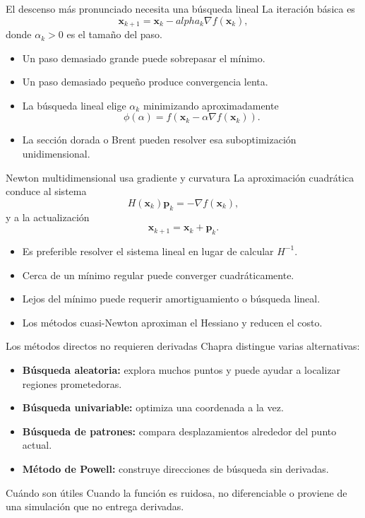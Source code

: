 \documentclass[../../main.tex]{subfiles}
\begin{document}
\begin{frame}{El descenso más pronunciado necesita una búsqueda lineal}
La iteración básica es
\[
\mathbf{x}_{k+1}
=
\mathbf{x}_k-alpha_k\nabla f(\mathbf{x}_k),
\]
donde $\alpha_k>0$ es el tamaño del paso.

\begin{itemize}
  \item Un paso demasiado grande puede sobrepasar el mínimo.
  \item Un paso demasiado pequeño produce convergencia lenta.
  \item La búsqueda lineal elige $\alpha_k$ minimizando aproximadamente
  \[
  \phi(\alpha)=f(\mathbf{x}_k-\alpha\nabla f(\mathbf{x}_k)).
  \]
  \item La sección dorada o Brent pueden resolver esa suboptimización unidimensional.
\end{itemize}
\end{frame}

\begin{frame}{Newton multidimensional usa gradiente y curvatura}
La aproximación cuadrática conduce al sistema
\[
H(\mathbf{x}_k)\mathbf{p}_k=-\nabla f(\mathbf{x}_k),
\]
y a la actualización
\[
\mathbf{x}_{k+1}=\mathbf{x}_k+\mathbf{p}_k.
\]

\begin{itemize}
  \item Es preferible resolver el sistema lineal en lugar de calcular $H^{-1}$.
  \item Cerca de un mínimo regular puede converger cuadráticamente.
  \item Lejos del mínimo puede requerir amortiguamiento o búsqueda lineal.
  \item Los métodos cuasi-Newton aproximan el Hessiano y reducen el costo.
\end{itemize}
\end{frame}

\begin{frame}{Los métodos directos no requieren derivadas}
Chapra distingue varias alternativas:
\begin{itemize}
  \item \textbf{Búsqueda aleatoria:} explora muchos puntos y puede ayudar a localizar regiones prometedoras.
  \item \textbf{Búsqueda univariable:} optimiza una coordenada a la vez.
  \item \textbf{Búsqueda de patrones:} compara desplazamientos alrededor del punto actual.
  \item \textbf{Método de Powell:} construye direcciones de búsqueda sin derivadas.
\end{itemize}

\begin{block}{Cuándo son útiles}
Cuando la función es ruidosa, no diferenciable o proviene de una simulación que no entrega derivadas.
\end{block}
\end{frame}
\end{document}
